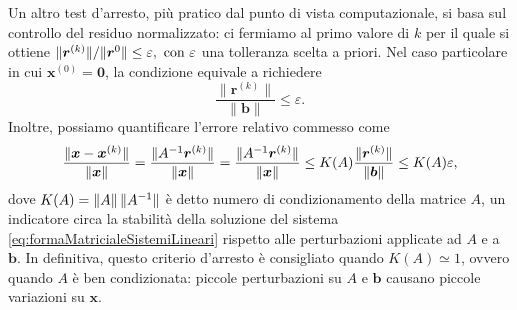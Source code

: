 Un altro test d'arresto, pi\`u pratico dal punto di vista computazionale, si basa sul controllo del residuo normalizzato: ci fermiamo al primo valore di $k$ 
per il quale si ottiene $\lVert\bm{r}^{(k)}\rVert/{\lVert\bm{r}^{0}\rVert} \le \varepsilon, \text{ con } \varepsilon$ una tolleranza scelta a priori.\newline
Nel caso particolare in cui $\bm{x}^{(0)} = \bm{0}$, la condizione equivale a richiedere
\begin{equation*}
    \frac{\|\bm{r}^{(k)}\|}{\|\bm{b}\|} \le \varepsilon. 
\end{equation*}
Inoltre, possiamo quantificare l'errore relativo commesso come
\begin{equation*}
    \frac{\lVert\bm{x}-\bm{x}^{(k)}\rVert}{\lVert\bm{x}\rVert} = \frac{\lVert A^{-1}\bm{r}^{(k)}\rVert}{\lVert\bm{x}\rVert} = \frac{\lVert A^{-1}\bm{r}^{(k)}\rVert}{\lVert\bm{x}\rVert} \le K(A) \frac{\lVert\bm{r}^{(k)}\rVert}{\lVert\bm{b}\rVert} \le K(A)\varepsilon,
\end{equation*}
dove $K(A)=\lVert A\rVert\,\lVert A^{-1}\rVert$ \`e detto numero di condizionamento della matrice $A$, un indicatore circa la stabilit\`a della soluzione del sistema \eqref{eq:formaMatricialeSistemiLineari} rispetto alle perturbazioni applicate ad $A$ e a $\bm{b}$.\newline
In definitiva, questo criterio d'arresto \`e consigliato quando $K(A)\simeq 1$, ovvero quando $A$ \`e ben condizionata: piccole perturbazioni su $A \text{ e } \bm{b}$ causano piccole variazioni su $\bm{x}$. 